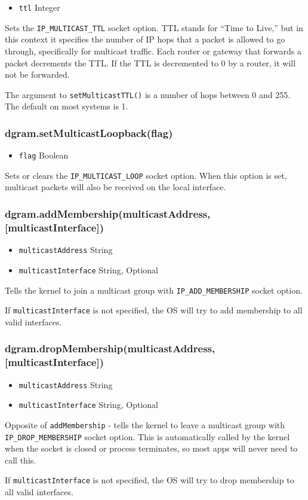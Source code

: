 \begin{itemize}
\item
  \texttt{ttl} Integer
\end{itemize}

Sets the \texttt{IP\_MULTICAST\_TTL} socket option. TTL stands for
``Time to Live,'' but in this context it specifies the number of IP hops
that a packet is allowed to go through, specifically for multicast
traffic. Each router or gateway that forwards a packet decrements the
TTL. If the TTL is decremented to 0 by a router, it will not be
forwarded.

The argument to \texttt{setMulticastTTL()} is a number of hops between 0
and 255. The default on most systems is 1.

\subsubsection{dgram.setMulticastLoopback(flag)}

\begin{itemize}
\item
  \texttt{flag} Boolean
\end{itemize}

Sets or clears the \texttt{IP\_MULTICAST\_LOOP} socket option. When this
option is set, multicast packets will also be received on the local
interface.

\subsubsection{dgram.addMembership(multicastAddress,
{[}multicastInterface{]})}

\begin{itemize}
\item
  \texttt{multicastAddress} String
\item
  \texttt{multicastInterface} String, Optional
\end{itemize}

Tells the kernel to join a multicast group with
\texttt{IP\_ADD\_MEMBERSHIP} socket option.

If \texttt{multicastInterface} is not specified, the OS will try to add
membership to all valid interfaces.

\subsubsection{dgram.dropMembership(multicastAddress,
{[}multicastInterface{]})}

\begin{itemize}
\item
  \texttt{multicastAddress} String
\item
  \texttt{multicastInterface} String, Optional
\end{itemize}

Opposite of \texttt{addMembership} - tells the kernel to leave a
multicast group with \texttt{IP\_DROP\_MEMBERSHIP} socket option. This
is automatically called by the kernel when the socket is closed or
process terminates, so most apps will never need to call this.

If \texttt{multicastInterface} is not specified, the OS will try to drop
membership to all valid interfaces.
